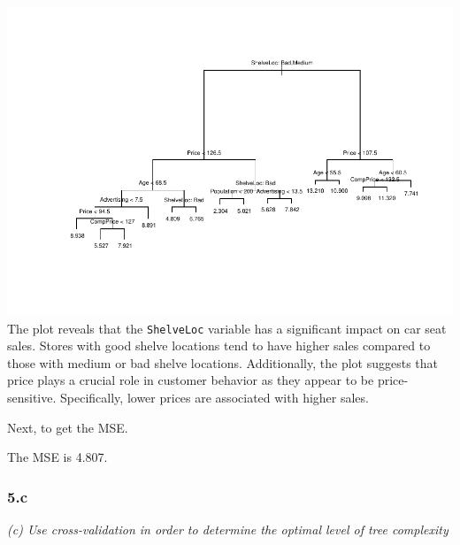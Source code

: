 \documentclass[
]{article}
\newenvironment{Shaded}{\begin{snugshade}}{\end{snugshade}}
\newcommand{\AttributeTok}[1]{\textcolor[rgb]{0.77,0.63,0.00}{#1}}
\newcommand{\DecValTok}[1]{\textcolor[rgb]{0.00,0.00,0.81}{#1}}
\newcommand{\FloatTok}[1]{\textcolor[rgb]{0.00,0.00,0.81}{#1}}
\newcommand{\FunctionTok}[1]{\textcolor[rgb]{0.00,0.00,0.00}{#1}}
\newcommand{\NormalTok}[1]{#1}
\newcommand{\OtherTok}[1]{\textcolor[rgb]{0.56,0.35,0.01}{#1}}
\newcommand{\SpecialCharTok}[1]{\textcolor[rgb]{0.00,0.00,0.00}{#1}}
\begin{document}
\includegraphics{Homework_13_Pan_files/figure-latex/unnamed-chunk-3-1.pdf}
The plot reveals that the \texttt{ShelveLoc} variable has a significant
impact on car seat sales. Stores with good shelve locations tend to have
higher sales compared to those with medium or bad shelve locations.
Additionally, the plot suggests that price plays a crucial role in
customer behavior as they appear to be price-sensitive. Specifically,
lower prices are associated with higher sales.

Next, to get the MSE.

\begin{Shaded}
\end{Shaded}

The MSE is 4.807.

\hypertarget{c}{%
\subsubsection{5.c}\label{c}}

\emph{(c) Use cross-validation in order to determine the optimal level
of tree complexity}
\end{document}
